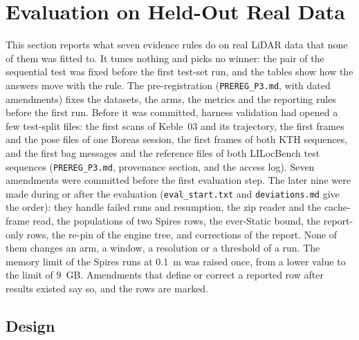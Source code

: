 \section{Evaluation on Held-Out Real Data}\label{sec:realeval}

This section reports what seven evidence rules do on real LiDAR data that none of them was fitted to. It tunes nothing and picks no winner: the pair of the sequential test was fixed before the first test-set run, and the tables show how the answers move with the rule. The pre-registration (\nolinkurl{PREREG_P3.md}, with dated amendments) fixes the datasets, the arms, the metrics and the reporting rules before the first run. Before it was committed, harness validation had opened a few test-split files: the first scans of Keble~03 and its trajectory, the first frames and the pose files of one Boreas session, the first frames of both KTH sequences, and the first bag messages and the reference files of both LILocBench test sequences (\nolinkurl{PREREG_P3.md}, provenance section, and the access log). Seven amendments were committed before the first evaluation step. The later nine were made during or after the evaluation (\nolinkurl{eval_start.txt} and \nolinkurl{deviations.md} give the order): they handle failed runs and resumption, the zip reader and the cache-frame read, the populations of two Spires rows, the ever-Static bound, the report-only rows, the re-pin of the engine tree, and corrections of the report. None of them changes an arm, a window, a resolution or a threshold of a run. The memory limit of the Spires runs at 0.1~m was raised once, from a lower value to the limit of $9$~GB. Amendments that define or correct a reported row after results existed say so, and the rows are marked.

\subsection{Design}\label{subsec:p3design}

